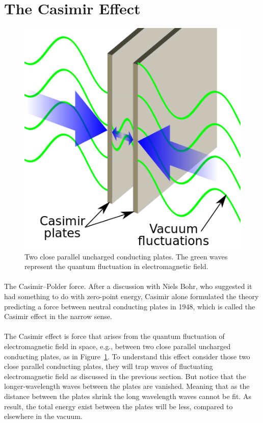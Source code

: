 \documentclass{article}
\begin{document}
    \section{The Casimir Effect}
        \begin{figure}
            \centering
            \includegraphics[width=0.5\linewidth]{plates.png}
            \caption{Two close parallel uncharged conducting plates. The green waves
            represent the quantum fluctuation in electromagnetic field.}
            \label{Plates}
        \end{figure}

        \paragraph{}
        The Casimir–Polder force. After a discussion with Niels Bohr, who suggested it had something to do with zero-point energy, Casimir alone formulated the theory predicting a force between neutral conducting plates in 1948, which is called the Casimir effect in the narrow sense.

        
        \paragraph{}
        The Casimir effect is force that arises from the quantum fluctuation of electromagnetic field in space, e.g., between two close parallel uncharged conducting plates, as in Figure~\ref{Plates}.
        To understand this effect consider those two close parallel conducting plates, they will trap 
        waves of fluctuating electromagnetic field as discussed in the previous section. But notice that 
        the longer-wavelength waves between the plates are vanished. Meaning that as the distance between
        the plates shrink the long wavelength waves cannot be fit. \cite*{casimir-sa} As result, the total energy exist between the 
        plates will be less, compared to elsewhere in the vacuum.
\end{document}
